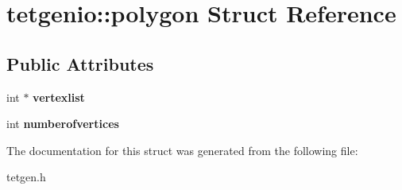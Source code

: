 \hypertarget{structtetgenio_1_1polygon}{}\section{tetgenio\+:\+:polygon Struct Reference}
\label{structtetgenio_1_1polygon}
\subsection*{Public Attributes}
\begin{DoxyCompactItemize}
\item 
\mbox{\label{structtetgenio_1_1polygon_a3cc2d3756bc093db5c252dd8f42a5001}} 
int $\ast$ {\bfseries vertexlist}
\item 
\mbox{\label{structtetgenio_1_1polygon_a019f9c62f145cf7d85227f401fcdba38}} 
int {\bfseries numberofvertices}
\end{DoxyCompactItemize}


The documentation for this struct was generated from the following file\+:\begin{DoxyCompactItemize}
\item 
tetgen.\+h\end{DoxyCompactItemize}
